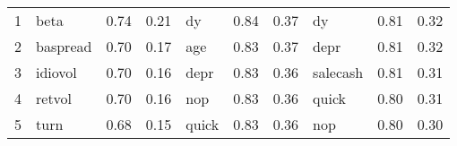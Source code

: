 \documentclass[12pt]{article}
\begin{document}
\begin{landscape}
\begin{footnotesize}
\begin{longtable}{l|lcc|lcc|lcc}
			
			1                     & beta                        & 0.74                                                                                 & 0.21                            & dy                          & 0.84                                                                                 & 0.37                            & dy                          & 0.81                                                                                 & 0.32                           \\
			2                     & baspread                    & 0.70                                                                                 & 0.17                            & age                         & 0.83                                                                                 & 0.37                            & depr                        & 0.81                                                                                 & 0.32                           \\
			3                     & idiovol                     & 0.70                                                                                 & 0.16                            & depr                        & 0.83                                                                                 & 0.36                            & salecash                    & 0.81                                                                                 & 0.31                           \\
			4                     & retvol                      & 0.70                                                                                 & 0.16                            & nop                         & 0.83                                                                                 & 0.36                            & quick                       & 0.80                                                                                 & 0.31                           \\
			5                     & turn                        & 0.68                                                                                 & 0.15                            & quick                       & 0.83                                                                                 & 0.36                            & nop                         & 0.80                                                                                 & 0.30                           \\

\end{longtable}
\end{footnotesize}
\end{landscape}
\end{document}
